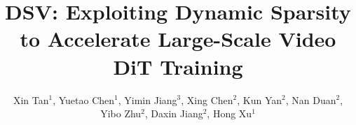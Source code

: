 \documentclass[sigplan,10pt,nonacm,screen]{acmart}
\newcommand{\sys}{{{DSV}}\xspace}
\begin{document}
\title{\sys: Exploiting Dynamic Sparsity to Accelerate Large-Scale Video DiT Training}

\author{
    Xin Tan$^1$,
    Yuetao Chen$^1$,
    Yimin Jiang$^3$,
    Xing Chen$^2$,
    Kun Yan$^2$,
    Nan Duan$^2$,\\
    Yibo Zhu$^2$,
    Daxin Jiang$^2$,
    Hong Xu$^1$
}





\renewcommand{\shortauthors}{}



\maketitle
\pagestyle{plain}




















\newpage





\clearpage
\twocolumn
\newpage

\appendix


\end{document}
